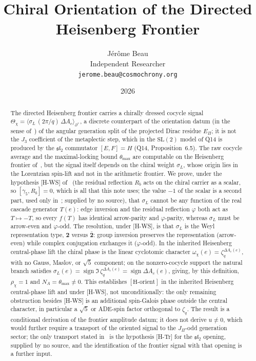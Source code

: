 \documentclass[11pt]{article}
\title{Chiral Orientation of the Directed Heisenberg Frontier}
\author{J\'er\^ome Beau\\
Independent Researcher\\
\texttt{jerome.beau@cosmochrony.org}}
\date{2026}
\theoremstyle{plain}
\theoremstyle{remark}
\newcommand{\zq}{\zeta_q}
\newcommand{\dac}{\Delta A_c}
\newcommand{\rhochi}{\rho_\chi}
\newcommand{\thmax}{\theta_{\max}}
\newcommand{\JPi}{J_\Pi}
\newcommand{\NA}{N_A}
\newcommand{\EPi}{E_\Pi}
\newcommand{\sgn}{\operatorname{sign}}
\newcommand{\two}{\mathbf{2}}
\newcommand{\twobar}{\bar{\mathbf{2}}}
\newcommand{\Horient}{[\mathrm{H\text{-}orient}]}
\begin{document}
  \maketitle

  \begin{abstract}
    The directed Heisenberg frontier carries a chirally dressed cocycle signal
    $\Theta_\chi = \langle \sigma_L\,(2\pi/q)\,\dac\rangle_{\partial^+}$, a discrete counterpart of the orientation
    datum (in the sense of~\cite{Beau2026q11of}) of the angular generation split of the projected Dirac residue
    $\EPi$; it is not the $J_3$ coefficient of the metaplectic step, which in the $\mathrm{SL}(2)$ model of Q14 is
    produced by the $\mathfrak{sl}_2$ commutator $[E,F]=H$ (Q14, Proposition~6.5).
    The raw cocycle average and the maximal-locking bound $\thmax$ are computable on the Heisenberg frontier of~\cite{Beau2026q11of}, but the
    signal itself depends on the chiral weight $\sigma_L$, whose origin lies in the Lorentzian spin-lift and not in the
    arithmetic frontier.
    We prove, under the hypothesis [H-WS] of~\cite{Beau2026q11of} (the residual reflection $R_b$ acts on the chiral
    carrier as a scalar, so $[\gamma_5,R_b]=0$, which is all that this note uses; the value $-1$ of the scalar is a second part,
used only in~\cite{Beau2026aog}; supplied by no source), that $\sigma_L$ cannot be any function of the real cascade generator $T(e)$: edge inversion and the residual
    reflection $\varphi$ both act as $T\mapsto -T$, so every $f(T)$ has identical arrow-parity and $\varphi$-parity,
    whereas $\sigma_L$ must be arrow-even and $\varphi$-odd.
    The resolution, under [H-WS], is that $\sigma_L$ is the Weyl representation type, $\two$ versus $\twobar$: group
    inversion preserves the representation (arrow-even) while complex conjugation exchanges it ($\varphi$-odd).
    In the inherited Heisenberg central-phase lift the chiral phase is the linear cyclotomic character
    $\omega_\chi(e)=\zq^{\dac(e)}$, with no Gauss, Maslov, or $\sqrt{5}$ component; on the nonzero-cocycle support the
    natural branch satisfies $\sigma_L(e)=\sgn \Im\,\zq^{\dac(e)} = \sgn\dac(e)$, giving, by this definition, $\rhochi = 1$ and
    $\NA = \thmax \neq 0$.
    This establishes $\Horient$ in the inherited Heisenberg central-phase lift and under [H-WS], not unconditionally:
    the only remaining obstruction besides [H-WS] is an additional spin-Galois phase outside the central character, in particular a $\sqrt{5}$ or
    ADE-spin factor orthogonal to $\zq$.
    The result is a conditional derivation of the frontier amplitude datum; it does not derive $u\neq 0$, which would
    further require a transport of the oriented signal to the $\JPi$-odd generation sector; the only transport
    stated in~\cite{Beau2026prs} is the hypothesis [H-Tr] for the $\mathfrak{sl}_2$ opening, supplied by no source,
    and the identification of the frontier signal with that opening is a further input.
  \end{abstract}
\end{document}
